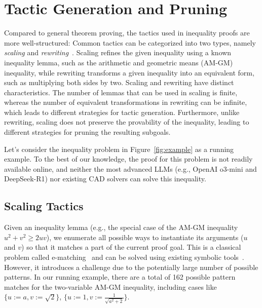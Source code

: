 \section{Tactic Generation and Pruning}
\label{sec:pruning}
Compared to general theorem proving, the tactics used in inequality proofs are more well-structured: Common tactics can be categorized into two types, namely \emph{scaling} and \emph{rewriting}~\citep{lee2004topics, Bruce2018Inequalities}. Scaling refines the given inequality using a known inequality lemma, such as the arithmetic and geometric means (AM-GM) inequality, while rewriting transforms a given inequality into an equivalent form, such as multiplying both sides by two. Scaling and rewriting have distinct characteristics. The number of lemmas that can be used in scaling is finite, whereas the number of equivalent transformations in rewriting can be infinite, which leads to different strategies for tactic generation. Furthermore, unlike rewriting, scaling does not preserve the provability of the inequality, leading to different strategies for pruning the resulting subgoals.

Let's consider the inequality problem in Figure~\ref{fig:example} as a running example. To the best of our knowledge, the proof for this problem is not readily available online, and neither the most advanced LLMs (e.g., OpenAI {o3-mini} and DeepSeek-{R1}) nor existing CAD solvers can solve this inequality.



\vspace{-0.3em}
\subsection{Scaling Tactics}
\vspace{-0.3em}

Given an inequality lemma (e.g., the special case of the AM-GM inequality $u^2 + v^2 \ge 2uv$), we enumerate all possible ways to instantiate its arguments ($u$ and $v$) so that it matches a part of the current proof goal. This is a classical problem called e-matching~\citep{de2007efficient, moskal2008matching} and can be solved using existing symbolic tools~\citep{2021-egg}. However, it introduces a challenge due to the potentially large number of possible patterns. In our running example, there are a total of 162 possible pattern matches for the two-variable AM-GM inequality, including cases like $\{u := a, v := \sqrt{2}\}$, $\{u := 1, v := \frac{1}{\sqrt{a^2+2}}\}$.

